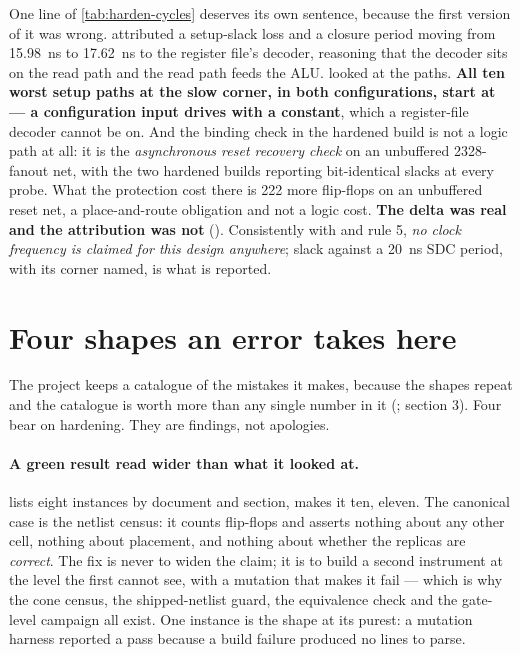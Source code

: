One line of \cref{tab:harden-cycles} deserves its own sentence, because
the first version of it was wrong.  attributed a
setup-slack loss and a closure period moving from
\SI{15.98}{\nano\second} to \SI{17.62}{\nano\second} to the register
file's decoder, reasoning that the decoder sits on the read path and the
read path feeds the ALU.  looked at the paths. \textbf{All ten
worst setup paths at the slow corner, in both configurations, start at
 --- a configuration input 
drives with a constant}, which a register-file decoder cannot be on. And
the binding check in the hardened build is not a logic path at all: it
is the \emph{asynchronous reset recovery check} on an unbuffered
\num{2328}-fanout net, with the two hardened builds reporting
bit-identical slacks at every probe. What the protection cost there is
222 more flip-flops on an unbuffered reset net, a place-and-route
obligation and not a logic cost. \textbf{The delta was real and the
attribution was not} (). Consistently
with  and  rule 5,
\emph{no clock frequency is claimed for this design anywhere}; slack
against a \SI{20}{\nano\second} SDC period, with its corner named, is
what is reported.

\section{Four shapes an error takes here}
\label{sec:harden-shapes}

The project keeps a catalogue of the mistakes it makes, because the
shapes repeat and the catalogue is worth more than any single number in
it (;  section 3). Four bear on
hardening. They are findings, not apologies.

\paragraph{A green result read wider than what it looked at.}
 lists eight instances by document and section,
 makes it ten,  eleven. The
canonical case is the netlist census: it counts flip-flops and asserts
nothing about any other cell, nothing about placement, and nothing about
whether the replicas are \emph{correct}. The fix is never to widen the
claim; it is to build a second instrument at the level the
first cannot see, with a mutation that makes it fail --- which is why
the cone census, the shipped-netlist guard, the equivalence check and
the gate-level campaign all exist. One instance is the shape at its
purest: a mutation harness reported a pass because a build failure
produced no  lines to parse.

